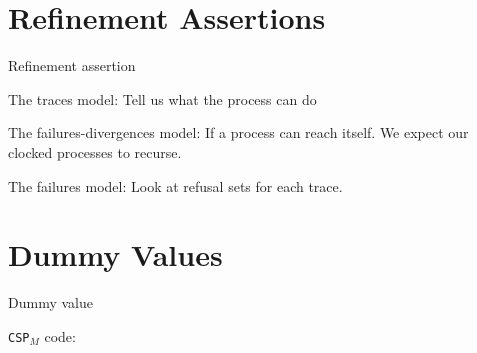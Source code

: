 \documentclass[11pt]{beamer}
\newcommand{\cspm}{CSP$_M$}
\begin{document}
\section{Refinement Assertions}
\begin{frame}{Refinement assertion}
    \begin{block}{}
     The traces model:
     Tell us what the process can do
    \end{block}

\pause
    \begin{block}{}
     The failures-divergences model: If a process can reach itself.
     We expect our clocked processes to recurse.
    \end{block}

    \pause
    \begin{block}{}
     The failures model:
     Look at refusal sets for each trace.
    \end{block}
\end{frame}

\section{Dummy Values}
%
\begin{frame}{Dummy value}
      \begin{block}{}
       \texttt{\cspm{}} code:
         \vspace{5mm}

          \scalebox{0.8}{\usebox{\dummyvalue}}
      \end{block}
\end{frame}
\end{document}
